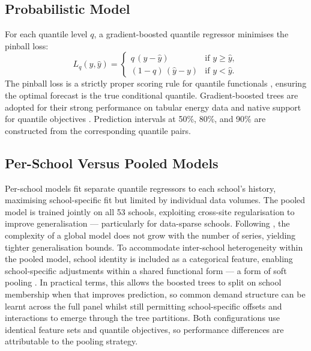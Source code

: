 \documentclass[12pt,a4paper]{article}
\begin{document}
\subsection{Probabilistic Model}

For each quantile level $q$, a gradient-boosted quantile regressor minimises the pinball loss:
\begin{equation}
  L_q(y,\hat{y}) =
  \begin{cases}
    q\,(y - \hat{y}) & \text{if } y \geq \hat{y}, \\
    (1-q)\,(\hat{y} - y) & \text{if } y < \hat{y}.
  \end{cases}
\end{equation}
The pinball loss is a strictly proper scoring rule for quantile functionals \citep{koenker1978, gneitingraftery2007}, ensuring the optimal forecast is the true conditional quantile. Gradient-boosted trees are adopted for their strong performance on tabular energy data and native support for quantile objectives \citep{friedman2001, ke2017}. Prediction intervals at 50\%, 80\%, and 90\% are constructed from the corresponding quantile pairs.

\subsection{Per-School Versus Pooled Models}

Per-school models fit separate quantile regressors to each school's history, maximising school-specific fit but limited by individual data volumes. The pooled model is trained jointly on all 53 schools, exploiting cross-site regularisation to improve generalisation --- particularly for data-sparse schools. Following \citet{montero2021}, the complexity of a global model does not grow with the number of series, yielding tighter generalisation bounds. To accommodate inter-school heterogeneity within the pooled model, school identity is included as a categorical feature, enabling school-specific adjustments within a shared functional form --- a form of soft pooling \citep{bentaieb2021, makridakis2022}. In practical terms, this allows the boosted trees to split on school membership when that improves prediction, so common demand structure can be learnt across the full panel whilst still permitting school-specific offsets and interactions to emerge through the tree partitions. Both configurations use identical feature sets and quantile objectives, so performance differences are attributable to the pooling strategy.
\end{document}
